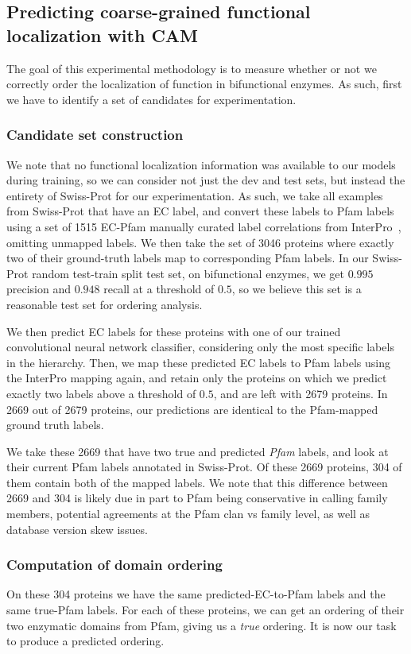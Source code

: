 \subsection{Predicting coarse-grained functional localization with CAM}
The goal of this experimental methodology is to measure whether or not we correctly order the localization of function in bifunctional enzymes. As such, first we have to identify a set of candidates for experimentation.

\subsubsection{Candidate set construction}
We note that no functional localization information was available to our models during training, so we can consider not just the dev and test sets, but instead the entirety of Swiss-Prot for our experimentation. As such, we take all examples from Swiss-Prot that have an EC label, and convert these labels to Pfam labels using a set of 1515 EC-Pfam manually curated label correlations from InterPro~\cite{mitchell2015interpro}, omitting unmapped labels. We then take the set of 3046 proteins where exactly two of their ground-truth labels map to corresponding Pfam labels. In our Swiss-Prot random test-train split test set, on bifunctional enzymes, we get $0.995$ precision and $0.948$ recall at a threshold of $0.5$, so we believe this set is a reasonable test set for ordering analysis.

We then predict EC labels for these proteins with one of our trained convolutional neural network classifier, considering only the most specific labels in the hierarchy. Then, we map these predicted EC labels to Pfam labels using the InterPro mapping again, and retain only the proteins on which we predict exactly two labels above a threshold of $0.5$, and are left with 2679 proteins. In 2669 out of 2679 proteins, our predictions are identical to the Pfam-mapped ground truth labels. 

We take these 2669 that have two true and predicted \textit{Pfam} labels, and look at their current Pfam labels annotated in Swiss-Prot. Of these 2669 proteins, 304 of them contain both of the mapped labels. We note that this difference between 2669 and 304 is likely due in part to Pfam being conservative in calling family members, potential agreements at the Pfam clan vs family level, as well as database version skew issues.

\subsubsection{Computation of domain ordering}
On these 304 proteins we have the same predicted-EC-to-Pfam labels and the same true-Pfam labels. For each of these proteins, we can get an ordering of their two enzymatic domains from Pfam, giving us a \textit{true} ordering. It is now our task to produce a predicted ordering.

